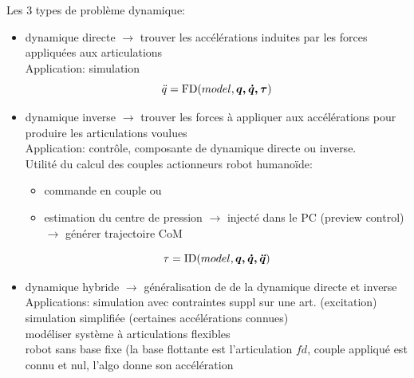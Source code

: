 \documentclass[10pt]{beamer}
\begin{document}
\begin{frame}[allowframebreaks]
	Les 3 types de problème dynamique:
  \begin{itemize}
  	\item dynamique directe $\longrightarrow$ trouver les accélérations induites par les forces appliquées aux articulations \\
	      Application: simulation \\
				\begin{equation}
				\ddot{q} = \mathrm{FD}(model,\boldsymbol{q,\dot{q},\tau})
				\end{equation}
  \item dynamique inverse $\longrightarrow$ trouver les forces à appliquer aux accélérations pour produire les articulations voulues \\
	      Application:  contrôle, composante de dynamique directe ou inverse. \\
	      Utilité du calcul des couples actionneurs robot humanoïde: \\
        \begin{itemize}
        \item commande en couple ou
        \item estimation du centre de pression $\longrightarrow$ injecté dans le PC (preview control) $\longrightarrow$ générer trajectoire CoM
        \end{itemize}
				\begin{equation}
				\mathbf{\tau} = \mathrm{ID}(model,\boldsymbol{q,\dot{q},\ddot{q}})
				\end{equation}
  \item dynamique hybride $\longrightarrow$ généralisation de de la dynamique directe et inverse \\
        Applications: simulation avec contraintes suppl sur une art. (excitation) \\
                    simulation simplifiée (certaines accélérations connues) \\
                    modéliser système à articulations flexibles \\
                    robot sans base fixe (la base flottante est l'articulation $fd$, couple appliqué est connu et nul, l'algo donne son accélération
  	\end{itemize}
    

\end{frame}
\end{document}
